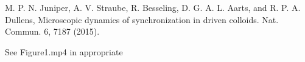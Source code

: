 \documentclass[prb,preprint]{revtex4}
\begin{document}
\begin{thebibliography}{99}

 M. P. N. Juniper, A. V. Straube, R. Besseling, D. G. A. L. Aarts, and R. P. A. Dullens, Microscopic dynamics of synchronization in driven colloids. Nat. Commun. 6, 7187 (2015).

 See Figure1.mp4 in appropriate %













\end{thebibliography}
\end{document}
